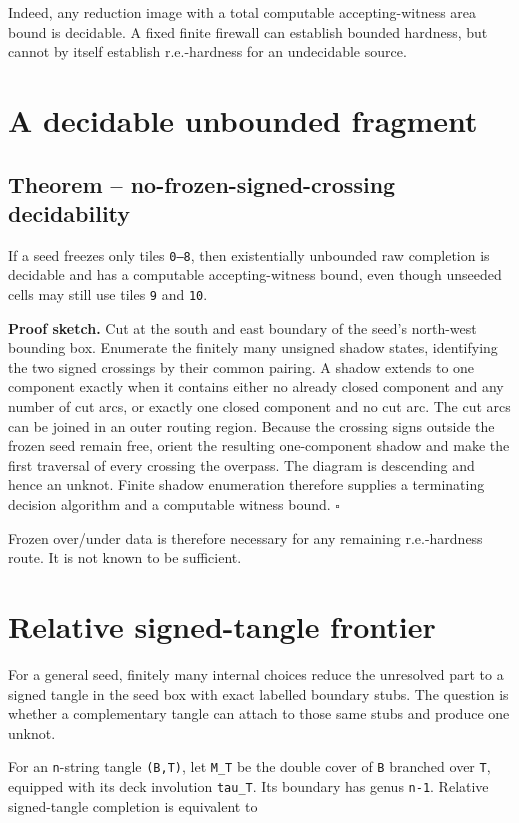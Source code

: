 \documentclass[11pt]{article}
\begin{document}
Indeed, any reduction image with a total computable accepting-witness area
bound is decidable.  A fixed finite firewall can establish bounded hardness,
but cannot by itself establish r.e.-hardness for an undecidable source.

\section{A decidable unbounded fragment}

\subsection{Theorem -- no-frozen-signed-crossing decidability}

If a seed freezes only tiles \texttt{0--8}, then existentially unbounded raw
completion is decidable and has a computable accepting-witness bound, even
though unseeded cells may still use tiles \texttt{9} and \texttt{10}.

\textbf{Proof sketch.}  Cut at the south and east boundary of the seed's
north-west bounding box.  Enumerate the finitely many unsigned shadow states,
identifying the two signed crossings by their common pairing.  A shadow
extends to one component exactly when it contains either no already closed
component and any number of cut arcs, or exactly one closed component and no
cut arc.  The cut arcs can be joined in an outer routing region.  Because the
crossing signs outside the frozen seed remain free, orient the resulting
one-component shadow and make the first traversal of every crossing the
overpass.  The diagram is descending and hence an unknot.  Finite shadow
enumeration therefore supplies a terminating decision algorithm and a
computable witness bound. \hfill$\square$

Frozen over/under data is therefore necessary for any remaining r.e.-hardness
route.  It is not known to be sufficient.

\section{Relative signed-tangle frontier}

For a general seed, finitely many internal choices reduce the unresolved part
to a signed tangle in the seed box with exact labelled boundary stubs.  The
question is whether a complementary tangle can attach to those same stubs and
produce one unknot.

For an \texttt{n}-string tangle \texttt{(B,T)}, let \texttt{M\_T} be the double cover of \texttt{B} branched
over \texttt{T}, equipped with its deck involution \texttt{tau\_T}.  Its boundary has genus
\texttt{n-1}.  Relative signed-tangle completion is equivalent to
\end{document}

